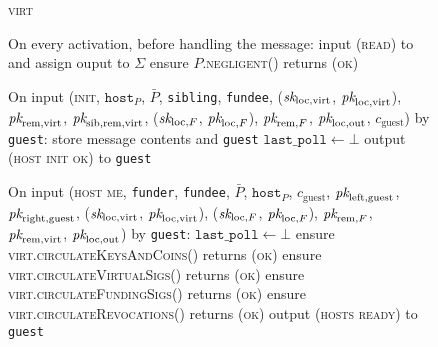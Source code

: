 \begin{figure}[H]
  \begin{processbox}{\textsc{virt}}
    \begin{algorithmic}[1]
      \State On every activation, before handling the message:
      \Indent
         
          \State input (\textsc{read}) to \ledger and assign ouput to $\Sigma$
              \State ensure $P$.\textsc{negligent}() returns (\textsc{ok})
            \EndFor
          \EndIf
        \EndIf
      \EndIndent
      \Statex

      \State {}
      \State On input (\textsc{init}, $\texttt{host}_P$, $\bar{P}$,
      \texttt{sibling}, \texttt{fundee}, ($\textit{sk}_{\mathrm{loc}, \mathrm{virt}}$,
      $\textit{pk}_{\mathrm{loc}, \mathrm{virt}}$), $\textit{pk}_{\mathrm{rem}, \mathrm{virt}}$,
      $\textit{pk}_{\mathrm{sib}, \mathrm{rem}, \mathrm{virt}}$, ($\textit{sk}_{\mathrm{loc}, F}$,
      $\textit{pk}_{\mathrm{loc}, F}$), $\textit{pk}_{\mathrm{rem}, F}$, $\textit{pk}_{\mathrm{loc},
      \mathrm{out}}$, $c_{\mathrm{guest}}$) by \texttt{guest}:
      \Indent
        \State store message contents and \texttt{guest}
        \State $\texttt{last\_poll} \gets \bot$
        \State output (\textsc{host init ok}) to \texttt{guest}
      \EndIndent
      \Statex

      \State On input (\textsc{host me}, \texttt{funder}, \texttt{fundee},
      $\bar{P}$, $\texttt{host}_P$, $c_{\mathrm{guest}}$, $\textit{pk}_{\mathrm{left},
      \mathrm{guest}}$, $\textit{pk}_{\mathrm{right}, \mathrm{guest}}$,
      ($\textit{sk}_{\mathrm{loc}, \mathrm{virt}}$, $\textit{pk}_{\mathrm{loc}, \mathrm{virt}}$),
      ($\textit{sk}_{\mathrm{loc}, F}$, $\textit{pk}_{\mathrm{loc}, F}$), $\textit{pk}_{\mathrm{rem}, F}$,
      $\textit{pk}_{\mathrm{rem}, \mathrm{virt}}$, $\textit{pk}_{\mathrm{loc}, \mathrm{out}}$) by
      \texttt{guest}:
      \Indent
        \State $\texttt{last\_poll} \gets \bot$
        \State ensure \textsc{virt.circulateKeysAndCoins}() returns (\textsc{ok})
        \State ensure \textsc{virt.circulateVirtualSigs}() returns (\textsc{ok})
        \State ensure \textsc{virt.circulateFundingSigs}() returns (\textsc{ok})
        \State ensure \textsc{virt.circulateRevocations}() returns (\textsc{ok})
        \State output (\textsc{hosts ready}) to \texttt{guest}
      \EndIndent
    \end{algorithmic}
  \end{processbox}
  \caption{}
  \label{code:virtual-layer:keys}
\end{figure}

